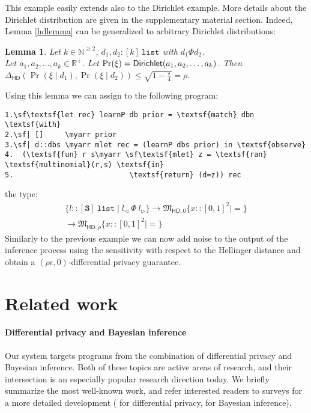 \documentclass{sig-alternate-05-2015}
\theoremstyle{plain}
\newtheorem{lemma}{Lemma}[section]
\theoremstyle{definition}
\theoremstyle{corollary}
\def\kwlist{\mathtt{list}}
\newcommand{\stlist}[1]{{#1}\ \kwlist}
\def\lvmark{\triangleleft}
\def\rvmark{\triangleright}
\renewcommand{\l}[1]{#1_\lvmark}
\renewcommand{\r}[1]{#1_\rvmark}
\def\R{\mathbb{R}}
\newcommand{\rplus}{\R^+}
\begin{document}
This example easily extends also to the Dirichlet example. More details about the Dirichlet distribution are
given in the supplementary material section.
Indeed, Lemma \ref{hdlemma} can be generalized to arbitrary Dirichlet distributions:
\begin{lemma}
Let $k\in \mathbb{N}^{\geq2}$, $d_1, d_2: \stlist{ [k]}$ with $d_1 \Phi d_2$. \\Let $a_1,a_2,\dots,a_k\in \rplus$. Let
$\Pr(\xi)={\sf Dirichlet}(a_1,a_2,\dots,a_k)$. Then
$\Delta_{\mathsf{HD}}(\Pr(\xi \mid d_1), \Pr(\xi \mid d_2))\leq
\sqrt{1-\frac{\pi}{4}}=\rho$.
\end{lemma}
Using this lemma we can assign to the following program:
\begin{Verbatim}[commandchars=\\\{\}]
1.\sf\textsf{let rec} learnP db prior = \textsf{match} dbn \textsf{with}
2.\sf| []     \myarr prior
3.\sf| d::dbs \myarr mlet rec = (learnP dbs prior) in \textsf{observe}
4.  (\textsf{fun} r s\myarr \sf\textsf{mlet} z = \textsf{ran} \textsf{multinomial}(r,s) \textsf{in}
5.                           \textsf{return} (d=z)) rec
\end{Verbatim}
the type:
\begin{multline*} 
\{l:: \stlist{[\textbf{3}]} \mid\l{l}\ \Phi\ \r{l}\}\rightarrow\mathfrak{M}_{\mathsf{HD},
  0}\{x:: [0,1]^2 \mid = \}\\
\rightarrow\mathfrak{M}_{\mathsf{HD}, \rho}\{x:: [0,1]^2
\mid= \}
\end{multline*}
Similarly to the previous example we can now add noise to the output
of the inference process using the sensitivity with respect to the
Hellinger distance and obtain a $(\rho\epsilon,0)$-differential
privacy guarantee. 
\section{Related work}

\paragraph*{Differential privacy and Bayesian inference}

Our system targets programs from the combination of differential privacy and
Bayesian inference. Both of these topics are active areas of research, and their
intersection is an especially popular research direction today. We briefly
summarize the most well-known work, and refer interested readers to surveys for
a more detailed development (\citet{DBLP:journals/fttcs/DworkR14} for
differential privacy, \citet{Bishop:2006} for Bayesian inference).
\end{document}
